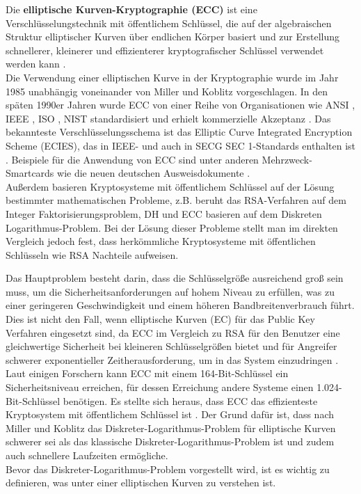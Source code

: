 Die \textbf{elliptische Kurven-Kryptographie (ECC)} ist eine Verschlüsselungstechnik mit öffentlichem Schlüssel, 
die auf der algebraischen Struktur elliptischer Kurven über endlichen Körper basiert \cite{mihNita} und zur Erstellung schnellerer, kleinerer und effizienterer kryptografischer Schlüssel verwendet werden kann \cite{khan}.\\

Die Verwendung einer elliptischen Kurve in der Kryptographie wurde im Jahr 1985 unabhängig voneinander von Miller \cite{miller} und Koblitz \cite{koblitz} vorgeschlagen. In den späten 1990er Jahren wurde ECC von einer Reihe von Organisationen wie ANSI \cite{ansi}, IEEE \cite{ieee}, ISO \cite{iso}, NIST \cite{nist} standardisiert und erhielt kommerzielle Akzeptanz \cite{GaMoDa}.
Das bekannteste Verschlüsselungsschema ist das Elliptic Curve Integrated Encryption Scheme (ECIES), das in IEEE- und auch in SECG SEC 1-Standards enthalten ist \cite{marKaur}. Beispiele für die Anwendung von ECC sind unter anderen Mehrzweck-Smartcards wie die  neuen  deutschen  Ausweisdokumente \cite{merLo}.\\

Außerdem basieren Kryptosysteme mit öffentlichem Schlüssel auf der Lösung bestimmter mathematischen Probleme, z.B. beruht das RSA-Verfahren auf dem Integer Faktorisierungsproblem, DH und ECC basieren auf dem Diskreten Logarithmus-Problem. Bei der Lösung dieser Probleme stellt man im direkten Vergleich jedoch fest, dass herkömmliche Kryptosysteme mit öffentlichen Schlüsseln wie RSA Nachteile aufweisen.

Das Hauptproblem besteht darin, dass die Schlüsselgröße ausreichend groß sein muss, um die Sicherheitsanforderungen auf hohem Niveau zu erfüllen, was zu einer geringeren Geschwindigkeit und einem höheren Bandbreitenverbrauch führt.\\

Dies ist nicht den Fall, wenn elliptische Kurven (EC) für das Public Key Verfahren eingesetzt sind, da ECC im Vergleich zu RSA für den Benutzer eine gleichwertige Sicherheit bei kleineren Schlüsselgrößen bietet und für Angreifer schwerer exponentieller Zeitherausforderung, um in das System einzudringen \cite{GaMoDa}.\\

Laut einigen Forschern kann ECC mit einem 164-Bit-Schlüssel ein Sicherheitsniveau erreichen, für dessen Erreichung andere Systeme einen 1.024-Bit-Schlüssel benötigen\cite{khan}. Es stellte sich heraus, dass ECC das effizienteste Kryptosystem mit öffentlichem Schlüssel ist \cite{naRaj}.
Der Grund dafür ist, dass nach Miller und Koblitz das Diskreter-Logarithmus-Problem für elliptische Kurven schwerer sei als das klassische Diskreter-Logarithmus-Problem ist und zudem auch schnellere Laufzeiten ermögliche.\\
Bevor das Diskreter-Logarithmus-Problem vorgestellt wird, ist es wichtig zu definieren, was unter einer elliptischen Kurven zu verstehen ist. 

